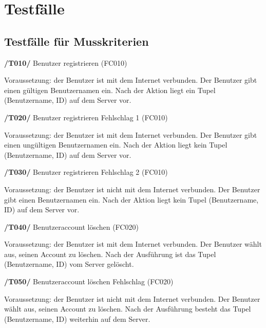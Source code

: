 \section{Testfälle}
\subsection{Testfälle für Musskriterien}
\textbf{/T010/} Benutzer registrieren (FC010) \\
\begin{itemize}
Voraussetzung: der Benutzer ist mit dem Internet verbunden.
Der Benutzer gibt einen gültigen Benutzernamen ein.
Nach der Aktion liegt ein Tupel (Benutzername, ID) auf dem Server vor.
\end{itemize}

\textbf{/T020/} Benutzer registrieren Fehlschlag 1 (FC010) \\
\begin{itemize}
Voraussetzung: der Benutzer ist mit dem Internet verbunden.
Der Benutzer gibt einen ungültigen Benutzernamen ein.
Nach der Aktion liegt kein Tupel (Benutzername, ID) auf dem Server vor.
\end{itemize}

\textbf{/T030/} Benutzer registrieren Fehlschlag 2 (FC010) \\
\begin{itemize}
Voraussetzung: der Benutzer ist nicht mit dem Internet verbunden.
Der Benutzer gibt einen Benutzernamen ein.
Nach der Aktion liegt kein Tupel (Benutzername, ID) auf dem Server vor.
\end{itemize}

\textbf{/T040/} Benutzeraccount löschen (FC020) \\
\begin{itemize}
Voraussetzung: der Benutzer ist mit dem Internet verbunden.
Der Benutzer wählt aus, seinen Account zu löschen.
Nach der Ausführung ist das Tupel (Benutzername, ID) vom Server gelöscht.
\end{itemize}

\textbf{/T050/} Benutzeraccount löschen Fehlschlag (FC020) \\
\begin{itemize}
Voraussetzung: der Benutzer ist nicht mit dem Internet verbunden.
Der Benutzer wählt aus, seinen Account zu löschen.
Nach der Ausführung besteht das Tupel (Benutzername, ID) weiterhin auf dem Server.
\end{itemize}

